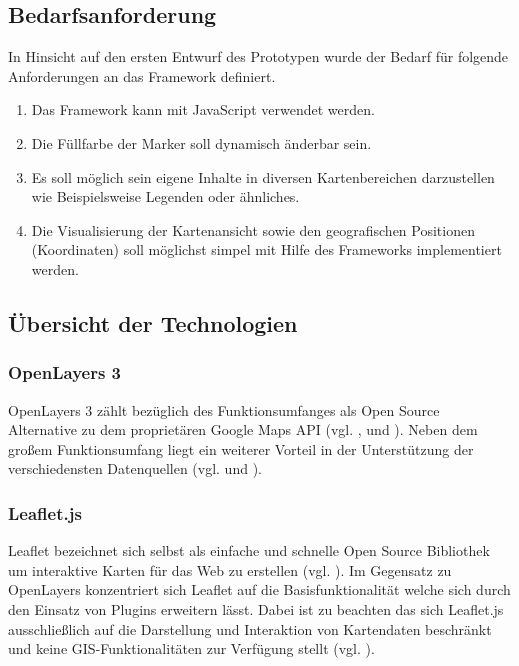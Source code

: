 \documentclass[../Bachelorarbeit.tex]{subfiles}
\begin{document}
\subsection{Bedarfsanforderung}
\label{Bedarf}
In Hinsicht auf den ersten Entwurf des Prototypen wurde der Bedarf für folgende Anforderungen an das Framework definiert.
\begin{enumerate}
	\item Das Framework kann mit JavaScript verwendet werden.
	\item Die Füllfarbe der Marker soll dynamisch änderbar sein.
	\item Es soll möglich sein eigene Inhalte in diversen Kartenbereichen darzustellen wie Beispielsweise Legenden oder ähnliches.
	\item Die Visualisierung der Kartenansicht sowie den geografischen Positionen (Koordinaten) soll möglichst simpel mit Hilfe des Frameworks implementiert werden.
\end{enumerate}
 
\subsection{Übersicht der Technologien}

\subsubsection{OpenLayers 3}
OpenLayers 3 zählt bezüglich des Funktionsumfanges als Open Source Alternative zu dem proprietären Google Maps \ac{API} (vgl. \cite{OpenlayersInfoSheet}, und \cite{VergleichApi}).
Neben dem großem Funktionsumfang liegt ein weiterer Vorteil in der Unterstützung der verschiedensten Datenquellen (vgl. \cite{Openlayers} und \cite[Abschnitt: Data Sources]{OpenlayersInfoSheet}). 

\subsubsection{Leaflet.js}
Leaflet bezeichnet sich selbst als einfache und schnelle Open Source Bibliothek um interaktive Karten für das Web zu erstellen (vgl. \cite{Leaflet}). 
Im Gegensatz zu OpenLayers konzentriert sich Leaflet auf die Basisfunktionalität welche sich durch den Einsatz von Plugins erweitern lässt.
Dabei ist zu beachten das sich Leaflet.js ausschließlich auf die Darstellung und Interaktion von Kartendaten beschränkt und keine \ac{GIS}-Funktionalitäten zur Verfügung stellt (vgl. \cite[Abschnitt: What Leaflet does not do]{LeafletMakeAMap}). 
\end{document}
